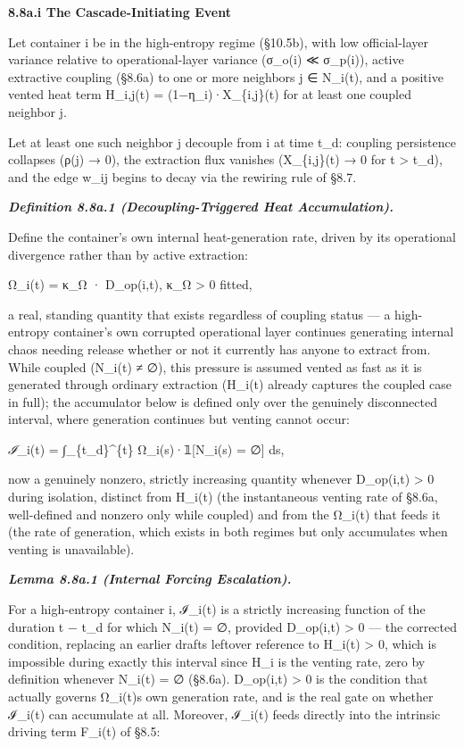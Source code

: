 \documentclass[
]{article}
\begin{document}
\textbf{8.8a.i The Cascade-Initiating Event}

Let container i be in the high-entropy regime (§10.5b), with low
official-layer variance relative to operational-layer variance (σ\_o(i)
≪ σ\_p(i)), active extractive coupling (§8.6a) to one or more neighbors
j ∈ N\_i(t), and a positive vented heat term H\_i,j(t) =
(1−η\_i)·X\_\{i,j\}(t) for at least one coupled neighbor j.

Let at least one such neighbor j decouple from i at time t\_d: coupling
persistence collapses (ρ(j) → 0), the extraction flux vanishes
(X\_\{i,j\}(t) → 0 for t \textgreater{} t\_d), and the edge w\_ij begins
to decay via the rewiring rule of §8.7.

\emph{\textbf{Definition 8.8a.1 (Decoupling-Triggered Heat
Accumulation).}}

Define the container's own internal heat-generation rate, driven by its
operational divergence rather than by active extraction:

Ω\_i(t) = κ\_Ω · D\_op(i,t), κ\_Ω \textgreater{} 0 fitted,

a real, standing quantity that exists regardless of coupling status ---
a high-entropy container's own corrupted operational layer continues
generating internal chaos needing release whether or not it currently
has anyone to extract from. While coupled (N\_i(t) ≠ ∅), this pressure
is assumed vented as fast as it is generated through ordinary extraction
(H\_i(t) already captures the coupled case in full); the accumulator
below is defined only over the genuinely disconnected interval, where
generation continues but venting cannot occur:

\emph{ℐ}\_i(t) = ∫\_\{t\_d\}\^{}\{t\} Ω\_i(s)·𝟙{[}N\_i(s) = ∅{]} ds,

now a genuinely nonzero, strictly increasing quantity whenever
D\_op(i,t) \textgreater{} 0 during isolation, distinct from H\_i(t) (the
instantaneous venting rate of §8.6a, well-defined and nonzero only while
coupled) and from the Ω\_i(t) that feeds it (the rate of generation,
which exists in both regimes but only accumulates when venting is
unavailable).

\emph{\textbf{Lemma 8.8a.1 (Internal Forcing Escalation).}}

For a high-entropy container i, ℐ\_i(t) is a strictly increasing
function of the duration t − t\_d for which N\_i(t) = ∅, provided
D\_op(i,t) \textgreater{} 0 --- the corrected condition, replacing an
earlier drafts leftover reference to H\_i(t) \textgreater{} 0, which is
impossible during exactly this interval since H\_i is the venting rate,
zero by definition whenever N\_i(t) = ∅ (§8.6a). D\_op(i,t)
\textgreater{} 0 is the condition that actually governs Ω\_i(t)s own
generation rate, and is the real gate on whether ℐ\_i(t) can accumulate
at all. Moreover, ℐ\_i(t) feeds directly into the intrinsic driving term
F\_i(t) of §8.5:
\end{document}
